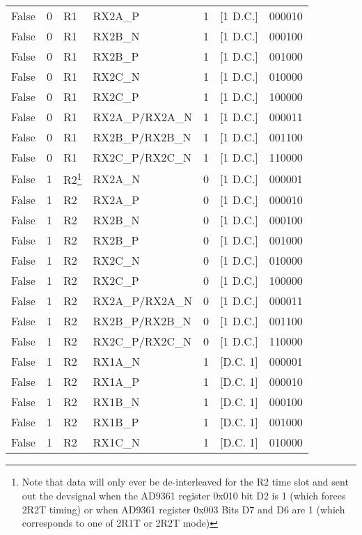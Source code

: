 \documentclass{article}
\begin{document}
\begin{landscape}
\begin{scriptsize}
\begin{longtable}{|p{4.5cm}|p{3.5cm}|p{1.5cm}|p{3.5cm}|p{1.75cm}|p{2.1cm}|p{2cm}|}
		False & 0 & R1 & RX2A\_P         & 1 & [1 D.C.] & 000010 \\
		False & 0 & R1 & RX2B\_N         & 1 & [1 D.C.] & 000100 \\
		False & 0 & R1 & RX2B\_P         & 1 & [1 D.C.] & 001000 \\
		False & 0 & R1 & RX2C\_N         & 1 & [1 D.C.] & 010000 \\
		False & 0 & R1 & RX2C\_P         & 1 & [1 D.C.] & 100000 \\
		False & 0 & R1 & RX2A\_P/RX2A\_N & 1 & [1 D.C.] & 000011 \\
		False & 0 & R1 & RX2B\_P/RX2B\_N & 1 & [1 D.C.] & 001100 \\
		False & 0 & R1 & RX2C\_P/RX2C\_N & 1 & [1 D.C.] & 110000 \\
		\hline
		False & 1 & R2\footnote{\label{r2}Note that data will only ever be de-interleaved for the R2 time slot and sent out the devsignal when the AD9361 register 0x010 bit D2 is 1 (which forces 2R2T timing) or when AD9361 register 0x003 Bits D7 and D6 are 1 (which corresponds to one of 2R1T or 2R2T mode)} & RX2A\_N         & 0 & [1 D.C.]  & 000001 \\
		False & 1 & R2\footref{r2} & RX2A\_P         & 0 & [1 D.C.]  & 000010 \\
		False & 1 & R2\footref{r2} & RX2B\_N         & 0 & [1 D.C.]  & 000100 \\
		False & 1 & R2\footref{r2} & RX2B\_P         & 0 & [1 D.C.]  & 001000 \\
		False & 1 & R2\footref{r2} & RX2C\_N         & 0 & [1 D.C.]  & 010000 \\
		False & 1 & R2\footref{r2} & RX2C\_P         & 0 & [1 D.C.]  & 100000 \\
		False & 1 & R2\footref{r2} & RX2A\_P/RX2A\_N & 0 & [1 D.C.]  & 000011 \\
		False & 1 & R2\footref{r2} & RX2B\_P/RX2B\_N & 0 & [1 D.C.]  & 001100 \\
		False & 1 & R2\footref{r2} & RX2C\_P/RX2C\_N & 0 & [1 D.C.]  & 110000 \\
		\hline
		False & 1 & R2\footref{r2} & RX1A\_N         & 1 & [D.C. 1] & 000001 \\
		False & 1 & R2\footref{r2} & RX1A\_P         & 1 & [D.C. 1] & 000010 \\
		False & 1 & R2\footref{r2} & RX1B\_N         & 1 & [D.C. 1] & 000100 \\
		False & 1 & R2\footref{r2} & RX1B\_P         & 1 & [D.C. 1] & 001000 \\
		False & 1 & R2\footref{r2} & RX1C\_N         & 1 & [D.C. 1] & 010000 \\

\end{longtable}
\end{scriptsize}
\end{landscape}
\end{document}
